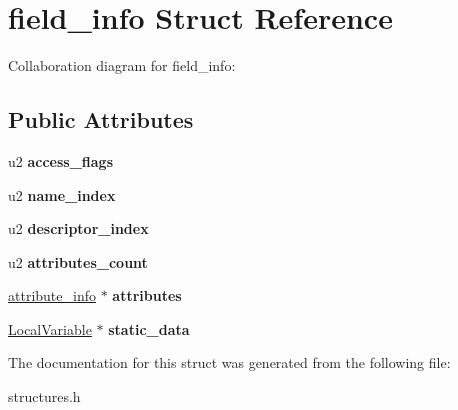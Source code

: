 \hypertarget{structfield__info}{}\section{field\+\_\+info Struct Reference}
\label{structfield__info}


Collaboration diagram for field\+\_\+info\+:
\subsection*{Public Attributes}
\begin{DoxyCompactItemize}
\item 
u2 {\bfseries access\+\_\+flags}\hypertarget{structfield__info_aa622dc9a5b5353d2f3eb2f416dacab4b}{}\label{structfield__info_aa622dc9a5b5353d2f3eb2f416dacab4b}

\item 
u2 {\bfseries name\+\_\+index}\hypertarget{structfield__info_a425e3ae85badd81c67ef00acca85ad9e}{}\label{structfield__info_a425e3ae85badd81c67ef00acca85ad9e}

\item 
u2 {\bfseries descriptor\+\_\+index}\hypertarget{structfield__info_a12dd492b7fb1d61da1ac14938d97b07f}{}\label{structfield__info_a12dd492b7fb1d61da1ac14938d97b07f}

\item 
u2 {\bfseries attributes\+\_\+count}\hypertarget{structfield__info_a83bfa4ff84a608e3dbd1c3968ebe1b80}{}\label{structfield__info_a83bfa4ff84a608e3dbd1c3968ebe1b80}

\item 
\hyperlink{structattribute__info}{attribute\+\_\+info} $\ast$ {\bfseries attributes}\hypertarget{structfield__info_afdda114944ae5eaae78c237f99257108}{}\label{structfield__info_afdda114944ae5eaae78c237f99257108}

\item 
\hyperlink{structLocalVariable}{Local\+Variable} $\ast$ {\bfseries static\+\_\+data}\hypertarget{structfield__info_a90fc91c18e08fe2325cdeded20ee4578}{}\label{structfield__info_a90fc91c18e08fe2325cdeded20ee4578}

\end{DoxyCompactItemize}


The documentation for this struct was generated from the following file\+:\begin{DoxyCompactItemize}
\item 
structures.\+h\end{DoxyCompactItemize}

